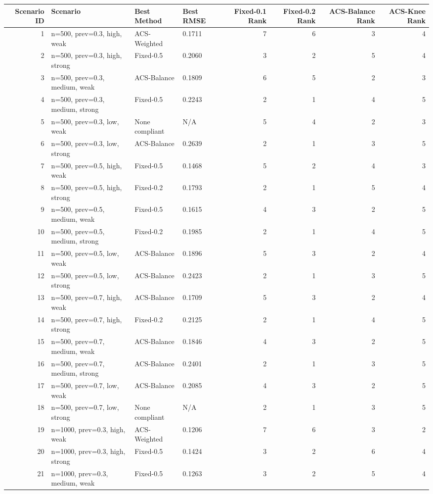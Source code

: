 \begin{tabular}{rlllrrrr}
\toprule
Scenario ID & Scenario & Best Method & Best RMSE & Fixed-0.1 Rank & Fixed-0.2 Rank & ACS-Balance Rank & ACS-Knee Rank \\
\midrule
1 & n=500, prev=0.3, high, weak & ACS-Weighted & 0.1711 & 7 & 6 & 3 & 4 \\
2 & n=500, prev=0.3, high, strong & Fixed-0.5 & 0.2060 & 3 & 2 & 5 & 4 \\
3 & n=500, prev=0.3, medium, weak & ACS-Balance & 0.1809 & 6 & 5 & 2 & 3 \\
4 & n=500, prev=0.3, medium, strong & Fixed-0.5 & 0.2243 & 2 & 1 & 4 & 5 \\
5 & n=500, prev=0.3, low, weak & None compliant & N/A & 5 & 4 & 2 & 3 \\
6 & n=500, prev=0.3, low, strong & ACS-Balance & 0.2639 & 2 & 1 & 3 & 5 \\
7 & n=500, prev=0.5, high, weak & Fixed-0.5 & 0.1468 & 5 & 2 & 4 & 3 \\
8 & n=500, prev=0.5, high, strong & Fixed-0.2 & 0.1793 & 2 & 1 & 5 & 4 \\
9 & n=500, prev=0.5, medium, weak & Fixed-0.5 & 0.1615 & 4 & 3 & 2 & 5 \\
10 & n=500, prev=0.5, medium, strong & Fixed-0.2 & 0.1985 & 2 & 1 & 4 & 5 \\
11 & n=500, prev=0.5, low, weak & ACS-Balance & 0.1896 & 5 & 3 & 2 & 4 \\
12 & n=500, prev=0.5, low, strong & ACS-Balance & 0.2423 & 2 & 1 & 3 & 5 \\
13 & n=500, prev=0.7, high, weak & ACS-Balance & 0.1709 & 5 & 3 & 2 & 4 \\
14 & n=500, prev=0.7, high, strong & Fixed-0.2 & 0.2125 & 2 & 1 & 4 & 5 \\
15 & n=500, prev=0.7, medium, weak & ACS-Balance & 0.1846 & 4 & 3 & 2 & 5 \\
16 & n=500, prev=0.7, medium, strong & ACS-Balance & 0.2401 & 2 & 1 & 3 & 5 \\
17 & n=500, prev=0.7, low, weak & ACS-Balance & 0.2085 & 4 & 3 & 2 & 5 \\
18 & n=500, prev=0.7, low, strong & None compliant & N/A & 2 & 1 & 3 & 5 \\
19 & n=1000, prev=0.3, high, weak & ACS-Weighted & 0.1206 & 7 & 6 & 3 & 2 \\
20 & n=1000, prev=0.3, high, strong & Fixed-0.5 & 0.1424 & 3 & 2 & 6 & 4 \\
21 & n=1000, prev=0.3, medium, weak & Fixed-0.5 & 0.1263 & 3 & 2 & 5 & 4 \\

\end{tabular}
